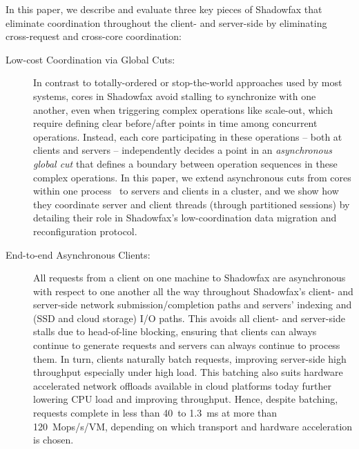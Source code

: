 In this paper, we describe and evaluate three key pieces of Shadowfax that
eliminate coordination throughout the client- and server-side by eliminating
cross-request and cross-core coordination:
%
\begin{description}
\item[Low-cost Coordination via Global Cuts:]
%
In contrast to totally-ordered or stop-the-world approaches used by most
systems, cores in Shadowfax avoid stalling to synchronize with one another, even when
triggering complex operations like scale-out, which require
defining clear before/after points in time among concurrent operations.
%
Instead, each core participating in these operations -- both at clients and
servers -- independently decides a point in an \emph{asynchronous global
cut} that defines a boundary between operation sequences in these complex operations.
%
In this paper, we extend asynchronous cuts from cores within one process~\cite{faster,cpr} to servers
and clients in a cluster, and we show how they coordinate server
and client threads (through partitioned sessions) by detailing
their role in Shadowfax's low-coordination data migration and
reconfiguration protocol.

%

\item[End-to-end Asynchronous Clients:]
All requests from a client on one machine to Shadowfax are asynchronous with
respect to one another all the way throughout Shadowfax's client- and
server-side network submission/completion paths and servers' indexing and
(SSD and cloud storage) I/O paths.
%
This avoids all client- and server-side stalls due to head-of-line
blocking, ensuring that clients can always continue to generate requests and
servers can always continue to process them.
%
In turn, clients naturally batch requests, improving server-side high
throughput especially under high load.
%
This batching also suits hardware accelerated network offloads available in
cloud platforms today further lowering CPU load and improving throughput.
%
Hence, despite batching, requests complete in less than 40~\us to 1.3~ms at
more than 120~Mops/s/VM, depending on which transport and hardware
acceleration is chosen.
%


\end{description}
